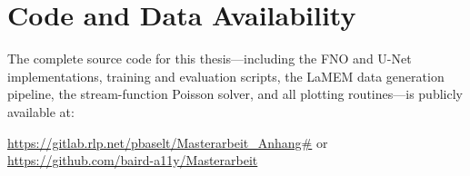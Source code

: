 \chapter{Code and Data Availability}
\label{app:code}

The complete source code for this thesis—including the FNO and U-Net implementations,
training and evaluation scripts, the LaMEM data generation pipeline, the stream-function
Poisson solver, and all plotting routines—is publicly available at:

\begin{center}
    \url{https://gitlab.rlp.net/pbaselt/Masterarbeit_Anhang#}
    or
    \url{https://github.com/baird-a11y/Masterarbeit}
\end{center}
